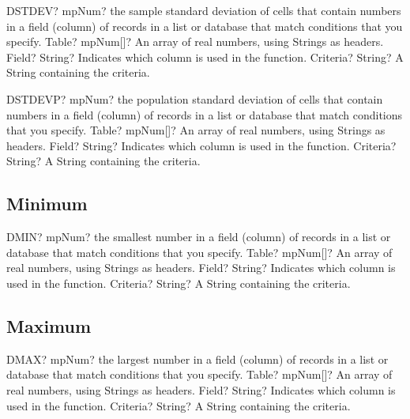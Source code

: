 \begin{mpFunctionsExtract}
	\mpWorksheetFunctionThreeNotImplemented
	{DSTDEV? mpNum? the sample standard deviation of cells that contain numbers in a field (column) of records in a list or database that match conditions that you specify.}
	{Table? mpNum[]? An array of real numbers, using Strings as headers.}
	{Field? String? Indicates which column is used in the function.}
	{Criteria? String? A String containing the criteria.}
\end{mpFunctionsExtract}

\vspace{0.6cm}
\begin{mpFunctionsExtract}
	\mpWorksheetFunctionThreeNotImplemented
	{DSTDEVP? mpNum? the population standard deviation of cells that contain numbers in a field (column) of records in a list or database that match conditions that you specify.}
	{Table? mpNum[]? An array of real numbers, using Strings as headers.}
	{Field? String? Indicates which column is used in the function.}
	{Criteria? String? A String containing the criteria.}
\end{mpFunctionsExtract}





\subsection{Minimum}

\begin{mpFunctionsExtract}
	\mpWorksheetFunctionThreeNotImplemented
	{DMIN? mpNum? the smallest number in a field (column) of records in a list or database that match conditions that you specify.}
	{Table? mpNum[]? An array of real numbers, using Strings as headers.}
	{Field? String? Indicates which column is used in the function.}
	{Criteria? String? A String containing the criteria.}
\end{mpFunctionsExtract}




\subsection{Maximum}

\begin{mpFunctionsExtract}
	\mpWorksheetFunctionThreeNotImplemented
	{DMAX? mpNum? the largest number in a field (column) of records in a list or database that match conditions that you specify.}
	{Table? mpNum[]? An array of real numbers, using Strings as headers.}
	{Field? String? Indicates which column is used in the function.}
	{Criteria? String? A String containing the criteria.}
\end{mpFunctionsExtract}




